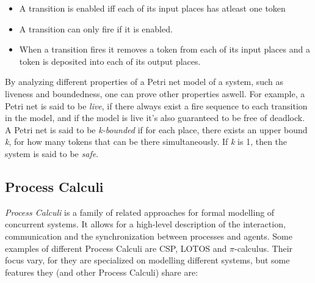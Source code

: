 \begin{itemize}
	\item A transition is enabled iff each of its input places has atleast one token
	\item A transition can only fire if it is enabled.
	\item When a transition fires it removes a token from each of its input places and a token is deposited into each of its output places.
\end{itemize}


By analyzing different properties of a Petri net model of a system, such as liveness and boundedness, one can prove other properties aswell. For example, a Petri net is said to be \textit{live}, if there always exist a fire sequence to each transition in the model, and if the model is live it's also guaranteed to be free of deadlock\cite{ramamoorthy1980performance}. A Petri net is said to be \textit{k-bounded} if for each place, there exists an upper bound \textit{k}, for how many tokens that can be there simultaneously. If \textit{k} is 1, then the system is said to be \textit{safe}. %



\subsection{Process Calculi}

\textit{Process Calculi} is a family of related approaches for formal modelling of concurrent systems. It allows for a high-level description of the interaction, communication and the synchronization between processes and agents. %
Some examples of different Process Calculi are CSP, LOTOS and $\pi$-calculus. Their focus vary, for they are specialized on modelling different systems, but some features they (and other Process Calculi) share are:


